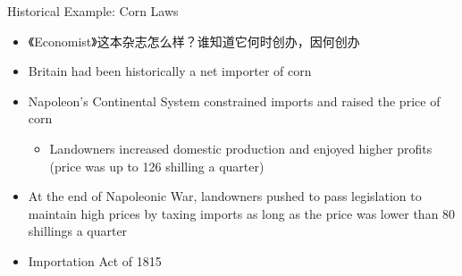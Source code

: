 \documentclass[10pt,hyperref={CJKbookmarks=true},xcolor=dvipsnames,aspectratio=169]{beamer}
\begin{document}
\begin{frame}{Historical Example: Corn Laws}

\begin{itemize}
	\item 《Economist》这本杂志怎么样？谁知道它何时创办，因何创办
\item Britain had been historically a net importer of corn 
\item Napoleon’s Continental System constrained imports and raised the price
of corn 

\begin{itemize}
\item Landowners increased domestic production and enjoyed higher profits
(price was up to 126 shilling a quarter) 
\end{itemize}
\item At the end of Napoleonic War, landowners pushed to pass legislation
to maintain high prices by taxing imports as long as the price was
lower than 80 shillings a quarter 
\item Importation Act of 1815 
\end{itemize}
\end{frame}
\end{document}
